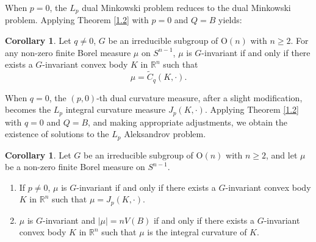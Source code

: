\documentclass[12pt, reqno]{amsart}
\theoremstyle{definition}
\newtheorem{corollary}[theorem]{Corollary}
\theoremstyle{remark}
\numberwithin{equation}{section}
\newcommand{\Lp}{L_{p}}
\begin{document}
When $p=0$, the $\Lp$ dual Minkowski problem reduces to the dual Minkowski problem. Applying Theorem \ref{1.2} with $p=0$ and $Q=B$ yields:





\begin{corollary}
	Let $q \neq 0$,  $G$ be an irreducible subgroup of $\mathrm{O}(n)$ with $n \geq 2$.  For any non-zero finite Borel measure $\mu$ on $S^{n-1}$, $\mu$ is $G$-invariant if and only if there exists a $G$-invariant convex body $K$ in $\mathbb{R}^n$ such that
	\[
	\mu = \widetilde{C}_{q}(K,   \cdot).
	\]
\end{corollary}




When $q=0$, the $(p,0)$-th dual curvature measure, after a slight modification, becomes the $L_p$ integral curvature measure $J_p(K, \cdot)$. Applying Theorem \ref{1.2} with $q=0$ and $Q=B$, and making appropriate adjustments, we obtain the existence of solutions to the $L_p$ Aleksandrov problem.


\begin{corollary}
	Let  $G$ be an  irreducible  subgroup of $\mathrm{O}(n)$ with $n \geq 2$, and let $\mu$ be a non-zero finite Borel measure  on $S^{n-1}$.
	\begin{enumerate}
		\item If $p\neq 0$, 	$\mu$ is $G$-invariant if and only if there exists a $G$-invariant convex body $K$ in $\mathbb{R}^n$ such that
		$\mu=J_{p}(K, \cdot)$.
		\item $\mu$ is $G$-invariant and $| \mu|=nV(B)$ if and only if there exists a $G$-invariant convex body $K$ in $\mathbb{R}^n$ such that
		$\mu$ is the integral curvature of $K$.
	\end{enumerate}
\end{corollary}
\end{document}
